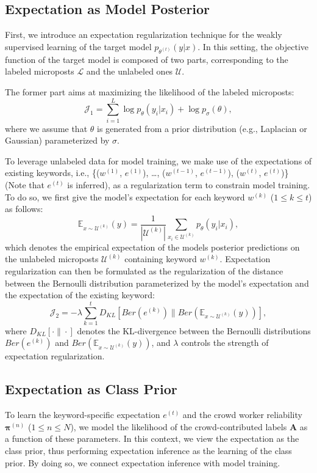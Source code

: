 \documentclass[letterpaper]{article}
\begin{document}
\subsection{Expectation as Model Posterior}
First, we introduce an expectation regularization technique for the weakly supervised learning of the target model $p_{\theta^{(t)}}(y|x)$. In this setting, the objective function of the target model is composed of two parts, corresponding to the labeled microposts $\mathcal{L}$ and the unlabeled ones $\mathcal{U}$.
 
The former part aims at maximizing the likelihood of the labeled microposts:
\begin{equation} 
    \mathcal{J}_1 = \sum_{i=1}^L \log p_\theta(y_i | x_i) + \log p_\sigma(\theta),
\end{equation}
%
where we assume that $\theta$ is generated from a prior distribution (e.g., Laplacian or Gaussian) parameterized by $\sigma$. 

To leverage unlabeled data for model training, we  make use of the expectations of existing keywords, i.e., \{($w^{(1)}$, $e^{(1)}$), \ldots, ($w^{(t-1)}$, $e^{(t-1)}$), ($w^{(t)}$, $e^{(t)}$)\} (Note that $e^{(t)}$ is inferred), as a regularization term to constrain model training. To do so, we first give the model's expectation for each keyword $w^{(k)}$ ($1\leq k\leq t$) as follows:
%
\begin{equation}
   \mathbb{E}_{x\sim \mathcal{U}^{(k)}}(y) =  \frac{1}{|\mathcal{U}^{(k)}|} \sum_{x_i\in \mathcal{U}^{(k)}} p_\theta(y_i|x_i),
\end{equation}
%
which denotes the empirical expectation of the models posterior predictions on the unlabeled microposts $\mathcal{U}^{(k)}$ containing keyword $w^{(k)}$. Expectation regularization can then be formulated as the regularization of the distance between the Bernoulli distribution parameterized by the model's expectation and the expectation of the existing keyword:
\begin{equation}
    \mathcal{J}_2 = - \lambda  \sum_{k=1}^t D_{KL}[Ber(e^{(k)})\|Ber(\mathbb{E}_{x\sim \mathcal{U}^{(k)}}(y))],
\end{equation}
where $D_{KL}[\cdot\|\cdot]$ denotes the KL-divergence between the Bernoulli distributions $Ber(e^{(k)})$ and $Ber(\mathbb{E}_{x\sim \mathcal{U}^{(k)}}(y))$, and $\lambda $ controls the strength of expectation regularization.

\subsection{Expectation as Class Prior}
To learn the keyword-specific expectation $e^{(t)}$ and the crowd worker reliability $\boldsymbol{\pi}^{(n)}$ ($1\leq n\leq N$), we model the likelihood of the crowd-contributed labels $\mathbf{A}$ as a function of these parameters. In this context, we view the expectation as the class prior, thus performing expectation inference as the learning of the class prior. By doing so, we connect expectation inference with model training. 
\end{document}
